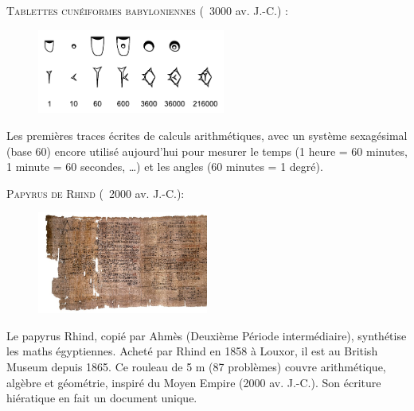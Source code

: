 \newpage


\textsc{ Tablettes cunéiformes babyloniennes} (~3000 av. J.-C.) : 

\vspace{.2cm}

\begin{figure} %
    \vspace{-0.75cm} %
    \includegraphics[width=0.55\textwidth]{../images/Proto-cuneiform-sexagesimal.pdf}
\end{figure}

Les premières traces écrites de calculs arithmétiques, avec un système sexagésimal (base 60) encore utilisé aujourd'hui pour mesurer le temps (1 heure = 60 minutes, 1 minute = 60 secondes, \dots ) et les angles (60 minutes = 1 degré).

\newpage

\textsc{ Papyrus de Rhind} (~2000 av. J.-C.):

\vspace{.2cm}

\begin{figure} %
    \vspace{-0.75cm} %
    \includegraphics[width=0.5\textwidth]{../images/Rhind-Papyrus.jpg}
\end{figure}

Le papyrus Rhind, copié par Ahmès (Deuxième Période intermédiaire), synthétise les maths égyptiennes. Acheté par Rhind en 1858 à Louxor, il est au British Museum depuis 1865. Ce rouleau de 5 m (87 problèmes) couvre arithmétique, algèbre et géométrie, inspiré du Moyen Empire (2000 av. J.-C.). Son écriture hiératique en fait un document unique.


